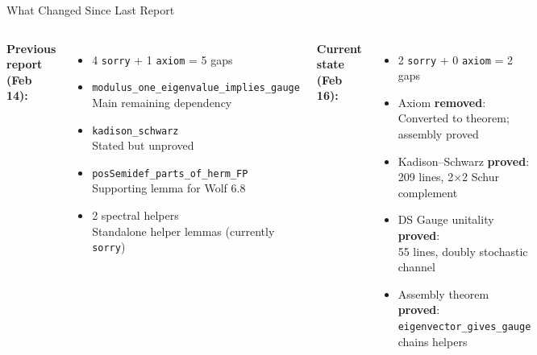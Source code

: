 \documentclass[aspectratio=169,10pt]{beamer}
\begin{document}
\begin{frame}{What Changed Since Last Report}
    \vspace{-0.7em}

    \begin{columns}[T]
        \textbf{\textcolor{dimwhite}{Previous report (Feb 14):}}
        \begin{itemize}\itemsep0.1em\small
            \item[\textcolor{softred}{$\boldsymbol\times$}] 4 \texttt{sorry} + 1 \texttt{axiom} = \textcolor{softred}{5 gaps}
            \item[\textcolor{softred}{\texttt{ax}}] \texttt{modulus\_one\_eigenvalue\_implies\_gauge}\\
                {\tiny Main remaining dependency}
            \item[\textcolor{softred}{\texttt{s}}] \texttt{kadison\_schwarz}\\
                {\tiny Stated but unproved}
            \item[\textcolor{softred}{\texttt{s}}] \texttt{posSemidef\_parts\_of\_herm\_FP}\\
                {\tiny Supporting lemma for Wolf 6.8}
            \item[\textcolor{softred}{\texttt{s}}] 2 spectral helpers\\
                {\tiny Standalone helper lemmas (currently \texttt{sorry})}
        \end{itemize}

        \textbf{\textcolor{leangreen}{Current state (Feb 16):}}
        \begin{itemize}\itemsep0.1em\small
            \item[\textcolor{leangreen}{\checkmark}] 2 \texttt{sorry} + 0 \texttt{axiom} = \textcolor{leangreen}{2 gaps}
            \item[\textcolor{leangreen}{\checkmark}] Axiom \textbf{removed}:\\
                {\tiny Converted to theorem; assembly proved}
            \item[\textcolor{leangreen}{\checkmark}] Kadison--Schwarz \textbf{proved}:\\
                {\tiny 209 lines, 2$\times$2 Schur complement}
            \item[\textcolor{leangreen}{\checkmark}] DS Gauge unitality \textbf{proved}:\\
                {\tiny 55 lines, doubly stochastic channel}
            \item[\textcolor{leangreen}{\checkmark}] Assembly theorem \textbf{proved}:\\
                {\tiny \texttt{eigenvector\_gives\_gauge} chains helpers}
        \end{itemize}
    \end{columns}


\end{frame}
\end{document}
